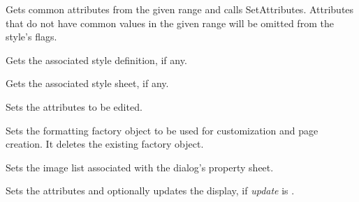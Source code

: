 Gets common attributes from the given range and calls SetAttributes. Attributes that do not have common values in the given range
will be omitted from the style's flags.

\label{wxrichtextformattingdialoggetstyledefinition}


Gets the associated style definition, if any.

\label{wxrichtextformattingdialoggetstylesheet}


Gets the associated style sheet, if any.

\label{wxrichtextformattingdialogsetattributes}


Sets the attributes to be edited.

\label{wxrichtextformattingdialogsetformattingdialogfactory}


Sets the formatting factory object to be used for customization and page creation.
It deletes the existing factory object.

\label{wxrichtextformattingdialogsetimagelist}


Sets the image list associated with the dialog's property sheet.

\label{wxrichtextformattingdialogsetstyle}


Sets the attributes and optionally updates the display, if {\it update} is \true.

\label{wxrichtextformattingdialogsetstyledefinition}


